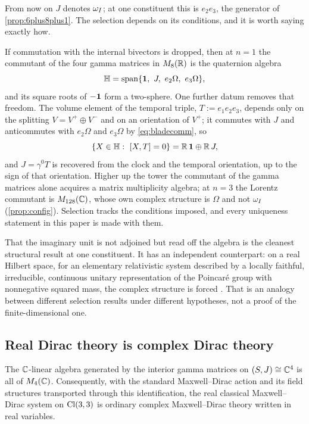 From now on $J$ denotes $\omega_I$; at one constituent this is $e_2e_3$, the generator of \cref{prop:6plus8plus1}. The selection
depends on its conditions, and it is worth saying exactly how.

\begin{remark}
\label{rem:ambient}
If commutation with the internal bivectors is dropped, then at $n=1$ the commutant of the four gamma matrices in $M_8(\mathbb{R})$ is the
quaternion algebra
\[
\HH=\operatorname{span}\{\id,\ J,\ e_2\Omega,\ e_3\Omega\},
\]
and its square roots of $-\mathbf 1$ form a two-sphere. One further datum removes that freedom. The volume element of the temporal triple,
$T:=e_1e_2e_3$, depends only on the splitting $V=V^+\oplus V^-$ and on an orientation of $V^+$; it commutes with $J$ and anticommutes
with $e_2\Omega$ and $e_3\Omega$ by \eqref{eq:bladecomm}, so
\[
\{X\in\mathbb{H}:\ [X,T]=0\}=\mathbb{R}\,\mathbf 1\oplus\mathbb{R}\,J ,
\]
and $J=\gamma^0T$ is recovered from the clock and the temporal orientation, up to the sign of that orientation. Higher up the
tower the commutant of the gamma matrices alone acquires a matrix multiplicity algebra; at $n=3$ the Lorentz commutant is
$M_{128}(\mathbb{C})$, whose own complex structure is $\Omega$ and not $\omega_I$ (\cref{prop:config}). Selection tracks the conditions imposed,
and every uniqueness statement in this paper is made with them.
\end{remark}

That the imaginary unit is not adjoined but read off the algebra is the cleanest structural result at one constituent. It has an
independent counterpart: on a real Hilbert space, for an elementary relativistic system described by a locally faithful, irreducible,
continuous unitary representation of the Poincar\'e group with nonnegative squared mass, the complex structure is forced \cite{MorettiOppio}.
That is an analogy between different selection results under different hypotheses, not a proof of the finite-dimensional one.

\subsection{Real Dirac theory is complex Dirac theory}

\begin{theorem}
\label{thm:realification}
The $\mathbb{C}$-linear algebra generated by the interior gamma matrices on $(S,J)\cong\mathbb{C}^4$ is all of $M_4(\mathbb{C})$. Consequently, with the standard Maxwell--Dirac action and its field structures transported through this identification,
the real classical Maxwell--Dirac system on $\mathrm{Cl}(3,3)$ is ordinary complex Maxwell--Dirac theory written in real variables.
\end{theorem}

